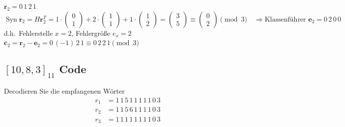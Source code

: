 \begin{loesung}
\medskip
$\mathbf{r}_2 = 0\,1\,2\,1$
\[
\operatorname{Syn} \mathbf{r}_2 = H\mathbf{r}_2^T = 1 \cdot \begin{pmatrix} 0\\ 1 \end{pmatrix} + 2 \cdot \begin{pmatrix} 1\\ 1 \end{pmatrix} + 1 \cdot \begin{pmatrix} 1\\ 2 \end{pmatrix} = \begin{pmatrix} 3\\ 5 \end{pmatrix} \equiv \begin{pmatrix} 0\\ 2 \end{pmatrix} \pmod{3}
\quad\Rightarrow \text{Klassenführer } \mathbf{e}_2 = 0\,2\,0\,0
\]
d.h.\ Fehlerstelle $x = 2$, Fehlergröße $e_x = 2$\\
$\mathbf{c}_2 = \mathbf{r}_2 - \mathbf{e}_2 = 0\,(-1)\,2\,1 \equiv 0\,2\,2\,1 \pmod{3}$
\end{loesung}

\subsection{$[10, 8, 3]_{11}$ Code}

\begin{aufgabe}[6\_9]
Decodieren Sie die empfangenen Wörter
\begin{align*}
r_1 &= 1\,1\,5\,1\,1\,1\,1\,1\,0\,3\\
r_2 &= 1\,1\,5\,6\,1\,1\,1\,1\,0\,3\\
r_3 &= 1\,1\,1\,1\,1\,1\,1\,1\,0\,3
\end{align*}
\end{aufgabe}

